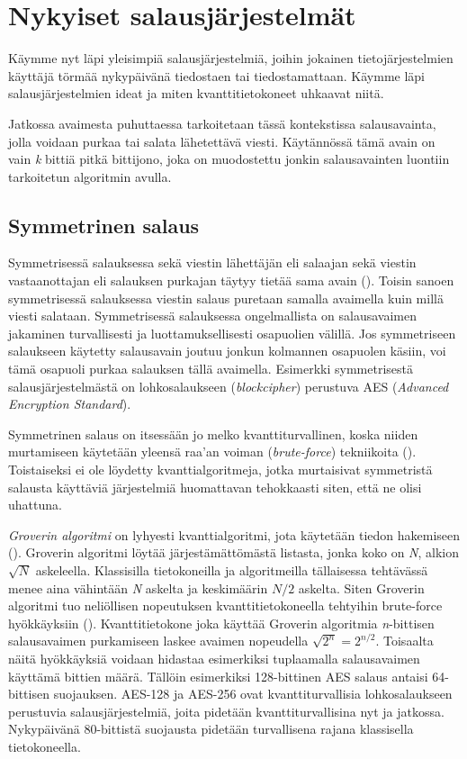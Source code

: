 \chapter{Nykyiset salausjärjestelmät\label{methods}}

Käymme nyt läpi yleisimpiä salausjärjestelmiä, joihin jokainen tietojärjestelmien käyttäjä törmää nykypäivänä tiedostaen tai tiedostamattaan. Käymme läpi salausjärjestelmien ideat ja miten kvanttitietokoneet uhkaavat niitä.

Jatkossa avaimesta puhuttaessa tarkoitetaan tässä kontekstissa salausavainta, jolla voidaan purkaa tai salata lähetettävä viesti. Käytännössä tämä avain on vain \emph{k} bittiä pitkä bittijono, joka on muodostettu jonkin salausavainten luontiin tarkoitetun algoritmin avulla.

\section{Symmetrinen salaus}
 Symmetrisessä salauksessa sekä viestin lähettäjän eli salaajan sekä viestin vastaanottajan eli salauksen purkajan täytyy tietää sama avain (\cite{bellare2005introduction}). Toisin sanoen symmetrisessä salauksessa viestin salaus puretaan samalla avaimella kuin millä viesti salataan.  Symmetrisessä salauksessa ongelmallista on salausavaimen jakaminen turvallisesti ja luottamuksellisesti osapuolien välillä. Jos symmetriseen salaukseen käytetty salausavain joutuu jonkun kolmannen osapuolen käsiin, voi tämä osapuoli purkaa salauksen tällä avaimella. Esimerkki symmetrisestä salausjärjestelmästä on lohkosalaukseen (\emph{blockcipher}) perustuva AES (\emph{Advanced Encryption Standard}).
 
 Symmetrinen salaus on itsessään jo melko kvanttiturvallinen, koska niiden murtamiseen käytetään yleensä raa'an voiman (\emph{brute-force}) tekniikoita (\cite{mavroeidis2018impact}). Toistaiseksi ei ole löydetty kvanttialgoritmeja, jotka murtaisivat symmetristä salausta käyttäviä järjestelmiä huomattavan tehokkaasti siten, että ne olisi uhattuna. 
 
 \emph{Groverin algoritmi} on lyhyesti kvanttialgoritmi, jota käytetään tiedon hakemiseen (\cite{hayward2008quantum}). Groverin algoritmi löytää järjestämättömästä listasta, jonka koko on \emph{N}, alkion $\sqrt{N}$ askeleella. Klassisilla tietokoneilla ja algoritmeilla tällaisessa tehtävässä menee aina vähintään \emph{N} askelta ja keskimäärin $N/2$ askelta. Siten Groverin algoritmi tuo neliöllisen nopeutuksen kvanttitietokoneella tehtyihin brute-force hyökkäyksiin (\cite{mavroeidis2018impact}). Kvanttitietokone joka käyttää Groverin algoritmia \emph{n}-bittisen salausavaimen purkamiseen laskee avaimen nopeudella $\sqrt{2^{n}} = 2^{n/2}$. Toisaalta näitä hyökkäyksiä voidaan hidastaa esimerkiksi tuplaamalla salausavaimen käyttämä bittien määrä. Tällöin esimerkiksi 128-bittinen AES salaus antaisi 64-bittisen suojauksen. AES-128 ja AES-256 ovat kvanttiturvallisia lohkosalaukseen perustuvia salausjärjestelmiä, joita pidetään kvanttiturvallisina nyt ja jatkossa. Nykypäivänä 80-bittistä suojausta pidetään turvallisena rajana klassisella tietokoneella.
 
